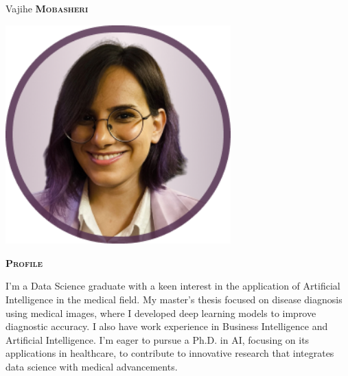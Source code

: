 \documentclass[11pt, a4paper]{article}
\newcommand{\headleft}[1]{\vspace*{3ex}\textsc{\textbf{#1}}\par%
    \vspace*{-1.5ex}\hrulefill\par\vspace*{0.7ex}}
\begin{document}
\setlength{\topskip}{0pt}
\setlength{\parindent}{0pt}
\setlength{\parskip}{0pt}
\setlength{\fboxsep}{0pt}
\pagestyle{empty}
\raggedbottom

\begin{minipage}[t]{0.33\textwidth} %
\colorbox{pink}{\begin{minipage}[t][5mm][t]{\textwidth}\null\hfill\null\end{minipage}}

\vspace{-.2ex} %
\colorbox{pink!60}{\color{black}  %
\textwidth\relax%
\begin{minipage}[t][293mm][t]{0.82\textwidth}
\raggedright
\vspace*{2.5ex}

\Large Vajihe \textbf{\textsc{Mobasheri}} \normalsize 

\null\hfill\includegraphics[width=0.65\textwidth]{photo.png}\hfill\null

\vspace*{0.5ex} %

\headleft{Profile}
I'm a Data Science graduate with a keen interest in the application of Artificial Intelligence in the medical field. My master's thesis focused on disease diagnosis using medical images, where I developed deep learning models to improve diagnostic accuracy. I also have work experience in Business Intelligence and Artificial Intelligence. I'm eager to pursue a Ph.D. in AI, focusing on its applications in healthcare, to contribute to innovative research that integrates data science with medical advancements.



\end{minipage}}
\end{minipage}
\end{document}

